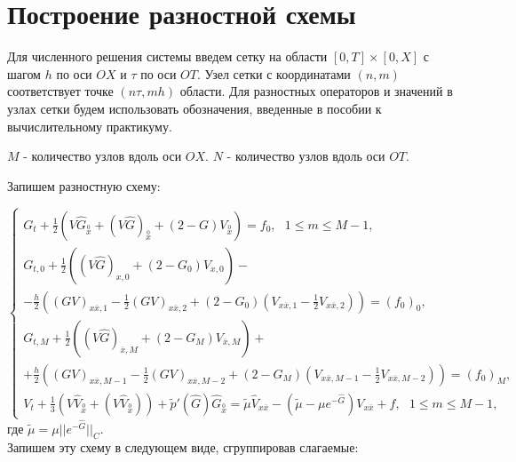 \documentclass[11pt]{article}
\newcommand{\wide}{
\stackrel{0}{x}
}
\begin{document}
\section{Построение разностной схемы}
Для численного решения системы введем сетку на области $[0, T] \times [0, X]$ с шагом $h$ по оси $OX$ и $\tau$ по оси $OT$. Узел сетки с координатами $(n, m)$ соответствует точке $(n\tau, mh)$ области. Для разностных операторов и значений в узлах сетки будем использовать обозначения, введенные в пособии к вычислительному практикуму.

$M$ - количество узлов вдоль оси $OX$.
$N$ - количество узлов вдоль оси $OT$.

Запишем разностную схему:

$$
\begin{cases}
\displaystyle{G_t + \frac{1}{2}(V\hat{G}_{\wide} + (V\hat{G})_{\wide} + (2-G)V_{\wide}) = f_0},\ \ \ 1 \leqslant m \leqslant M - 1,\\
\displaystyle{G_{t,0} + \frac{1}{2} ((V\hat{G})_{x,0} + (2 - G_0)V_{x, 0})} - \\
\displaystyle{
-\frac{h}{2}((GV)_{x\overline{x}, 1} - 
\frac{1}{2}(GV)_{x\overline{x}, 2} + (2 - G_0)
(V_{x\overline{x}, 1} - 
\frac{1}{2}V_{x\overline{x}, 2})) = (f_0)_0},\\
\displaystyle{
G_{t, M} + \frac{1}{2}((V\hat{G})_{\overline{x}, M} + (2 - G_M)V_{\overline{x}, M}) +} \\ 
\displaystyle{+\frac{h}{2}((GV)_{x\overline{x}, M-1} - 
\frac{1}{2}(GV)_{x\overline{x}, M-2} + 
(2-G_M)(V_{x\overline{x}, M - 1} - 
\frac{1}{2}V_{x\overline{x}, M-2})) = (f_0)_M},\\
\displaystyle{V_t + \frac{1}{3}(V\hat{V}_{\wide} + (V\hat{V}_{\wide})) + \tilde{p}'(\hat{G})\hat{G}_{\wide} = \tilde{\mu}\hat{V}_{x\overline{x}} - 
(\tilde{\mu} - \mu e^{-\hat{G}})V_{x\overline{x}} + f},\ \ \  1 \leqslant m \leqslant M - 1,
\end{cases}
$$
где $\tilde{\mu} = \mu\vert\vert e^{-\hat{G}}\vert\vert_C$.
\\[5pt]
Запишем эту схему в следующем виде, сгруппировав слагаемые:
\end{document}
